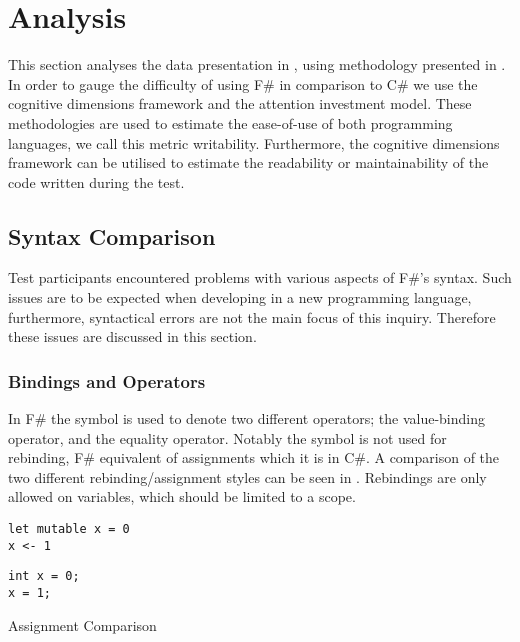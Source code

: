 \section{Analysis}
This section analyses the data presentation in , using methodology presented in . In order to gauge the difficulty of using F\# in comparison to C\# we use the cognitive dimensions framework and the attention investment model. These methodologies are used to estimate the ease-of-use of both programming languages, we call this metric writability. Furthermore, the cognitive dimensions framework can be utilised to estimate the readability or maintainability of the code written during the test.

\subsection{Syntax Comparison}
Test participants encountered problems with various aspects of F\#'s syntax. Such issues are to be expected when developing in a new programming language, furthermore, syntactical errors are not the main focus of this inquiry. Therefore these issues are discussed in this section.

\subsubsection{Bindings and Operators}
In F\# the \ttt{=} symbol is used to denote two different operators; the value-binding operator, and the equality operator. Notably the symbol is not used for rebinding, F\# equivalent of assignments which it is in C\#. A comparison of the two different rebinding/assignment styles can be seen in . Rebindings are only allowed on  variables, which should be limited to a scope.

\begin{listing}[H]
\begin{minipage}{.45\textwidth}
\begin{verbatim}
let mutable x = 0
x <- 1
\end{verbatim}
\end{minipage}
\hfill
\begin{minipage}{.45\textwidth}
\begin{verbatim}
int x = 0;
x = 1;
\end{verbatim}
\end{minipage}
\caption{Assignment Comparison}
\label{lst:ass-comp}
\end{listing}

